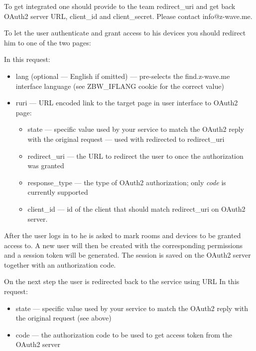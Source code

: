 To get integrated one should provide to the \zwaveme team redirect\_uri and get back OAuth2 server URL, client\_id and client\_secret. Please contact info@z-wave.me.

To let the user authenticate and grant access to his devices you should redirect him to one of the two pages:

In this request:
\begin{itemize}
\item lang (optional --- English if omitted) — pre-selects the find.z-wave.me interface language (see ZBW\_IFLANG cookie for the correct value)
\item ruri --- URL encoded link to the target page in \zway user interface to OAuth2 page:
\begin{itemize}
	\item state --- specific value used by your service to match the OAuth2 reply with the original request --- used with redirected to redirect\_uri
	\item redirect\_uri --- the URL to redirect the user to once the authorization was granted
	\item response\_type --- the type of OAuth2 authorization; only \textit{code} is currently supported
	\item client\_id --- id of the client that should match redirect\_uri on \zwaveme OAuth2 server.
\end{itemize}
\end{itemize}

After the user logs in to \zway he is asked to mark rooms and devices to be granted access to.
A new user will then be created with the corresponding permissions and a session token will be generated.
The session is saved on the \zwaveme OAuth2 server together with an authorization code.

On the next step the user is redirected back to the service using URL 
In this request:
\begin{itemize}
\item state --- specific value used by your service to match the OAuth2 reply with the original request (see above)
\item code --- the authorization code to be used to get access token from the OAuth2 server
\end{itemize}

